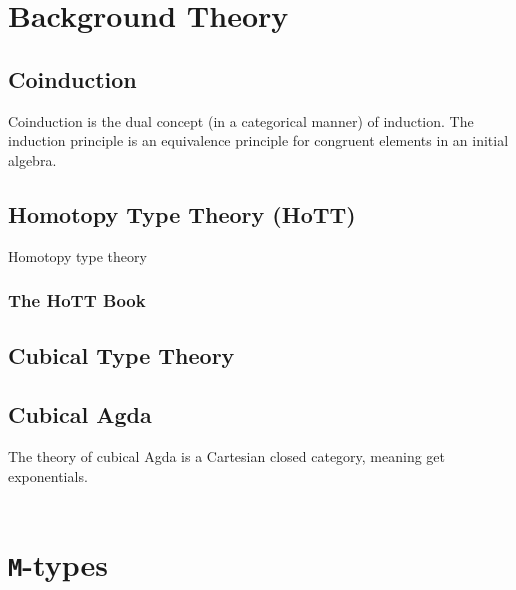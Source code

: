 \documentclass[twoside,11pt,openright]{report}
\theoremstyle{plain} %
\theoremstyle{definition}
\theoremstyle{remark}
\begin{document}

\chapter{Background Theory}
\section{Coinduction}
Coinduction is the dual concept (in a categorical manner) of induction. The induction principle is an equivalence principle for congruent elements in an initial algebra.

\section{Homotopy Type Theory (HoTT)}
Homotopy type theory 
\subsection{The HoTT Book}

\section{Cubical Type Theory}

\section{Cubical Agda}
The theory of cubical Agda is a Cartesian closed category, meaning get exponentials.
\\ \\


\chapter{\texttt{M}-types}
\label{ch:m-types}
\end{document}
